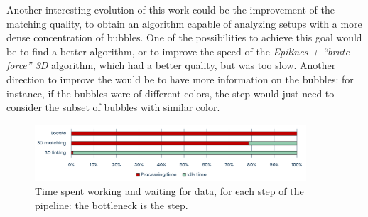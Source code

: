

Another interesting evolution of this work could be the improvement of the matching quality, to obtain an algorithm capable of analyzing setups with a more dense concentration of bubbles.
One of the possibilities to achieve this goal would be to find a better \match* algorithm, or to improve the speed of the \textit{Epilines + ``brute-force'' 3D} algorithm, which had a better quality, but was too slow.
Another direction to improve the \match* would be to have more information on the bubbles: for instance, if the bubbles were of different colors, the \visual* step would just need to consider the subset of bubbles with similar color.

\begin{figure}
	\centerline{\includegraphics[width=0.9\textwidth]{images/pipeline-usage-graph.png}}
	\caption{\centering Time spent working and waiting for data, for each step of the pipeline: the bottleneck is the \locate* step.}
	\label{fig:intro:pipeline-usage}
\end{figure}
